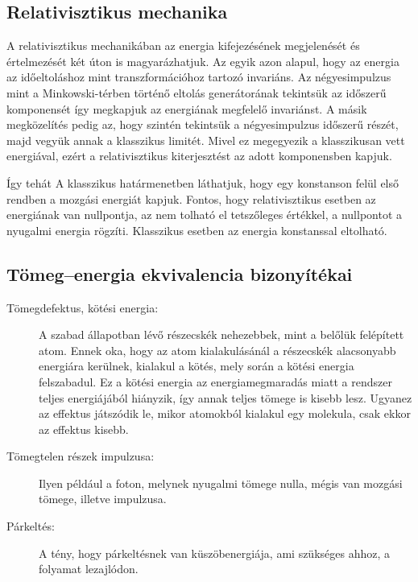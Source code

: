   \subsection{Relativisztikus mechanika}
   
   A relativisztikus mechanikában az energia kifejezésének megjelenését és értelmezését két úton is magyarázhatjuk.
   Az egyik azon alapul, hogy az energia az időeltoláshoz mint transzformációhoz tartozó invariáns.
   Az négyesimpulzus mint a Minkowski-térben történő eltolás generátorának tekintsük az időszerű komponensét így megkapjuk az energiának megfelelő invariánst.
   A másik megközelítés pedig az, hogy szintén tekintsük a négyesimpulzus időszerű részét, majd vegyük annak a klasszikus limitét.
   Mivel ez megegyezik a klasszikusan vett energiával, ezért a relativisztikus kiterjesztést az adott komponensben kapjuk. 
   
   Így tehát
   A klasszikus határmenetben láthatjuk, hogy egy konstanson felül első rendben a mozgási energiát kapjuk.
   Fontos, hogy relativisztikus esetben az energiának van nullpontja, az nem tolható el tetszőleges értékkel, a nullpontot a nyugalmi energia rögzíti.
   Klasszikus esetben az energia konstanssal eltolható. 
   
  \subsection{Tömeg--energia ekvivalencia bizonyítékai}
   
   \begin{description}
    \item[Tömegdefektus, kötési energia:] A szabad állapotban lévő részecskék nehezebbek, mint a belőlük felépített atom.
   Ennek oka, hogy az atom kialakulásánál a részecskék alacsonyabb energiára kerülnek, kialakul a kötés, mely során a kötési energia felszabadul.
   Ez a kötési energia az energiamegmaradás miatt a rendszer teljes energiájából hiányzik, így annak teljes tömege is kisebb lesz.
   Ugyanez az effektus játszódik le, mikor atomokból kialakul egy molekula, csak ekkor az effektus kisebb. 
    \item[Tömegtelen részek impulzusa:] Ilyen például a foton, melynek nyugalmi tömege nulla, mégis van mozgási tömege, illetve impulzusa. 
    \item[Párkeltés:] A tény, hogy párkeltésnek van küszöbenergiája, ami szükséges ahhoz, a folyamat lezajlódon.
   \end{description}
   

